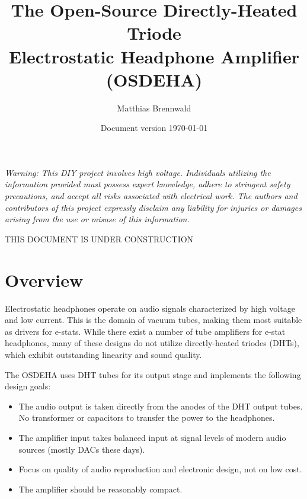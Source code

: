 





\title{The Open-Source Directly-Heated Triode \\ Electrostatic Headphone Amplifier \\ (OSDEHA)}
\author{Matthias Brennwald}
\date{Document version \today}




\maketitle

\emph{Warning: This DIY project involves high voltage. Individuals utilizing the information provided must possess expert knowledge, adhere to stringent safety precautions, and accept all risks associated with electrical work. The authors and contributors of this project expressly disclaim any liability for injuries or damages arising from the use or misuse of this information.}


THIS DOCUMENT IS UNDER CONSTRUCTION


\section{Overview}

Electrostatic headphones operate on audio signals characterized by high voltage and low current. This is the domain of vacuum tubes, making them most suitable as drivers for e-stats.  While there exist a number of tube amplifiers for e-stat headphones, many of these designs do not utilize directly-heated triodes (DHTs), which exhibit outstanding linearity and sound quality.\par

The OSDEHA uses DHT tubes for its output stage and implements the following design goals:
\begin{itemize}
\item The audio output is taken directly from the anodes of the DHT output tubes. No transformer or capacitors to transfer the power to the headphones.
\item The amplifier input takes balanced input at signal levels of modern audio sources (mostly DACs these days).
\item Focus on quality of audio reproduction and electronic design, not on low cost.
\item The amplifier should be reasonably compact.
\end{itemize}



